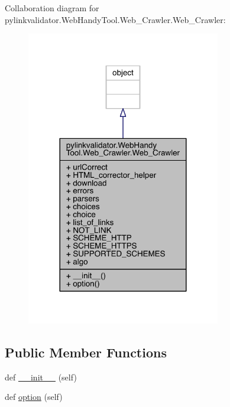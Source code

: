 Collaboration diagram for pylinkvalidator.\+Web\+Handy\+Tool.\+Web\+\_\+\+Crawler.\+Web\+\_\+\+Crawler\+:
\nopagebreak
\begin{figure}[H]
\begin{center}
\leavevmode
\includegraphics[width=240pt]{classpylinkvalidator_1_1_web_handy_tool_1_1_web___crawler_1_1_web___crawler__coll__graph}
\end{center}
\end{figure}
\subsection*{Public Member Functions}
\begin{DoxyCompactItemize}
\item 
def \hyperlink{classpylinkvalidator_1_1_web_handy_tool_1_1_web___crawler_1_1_web___crawler_a0c6acebeeeb1b339c5b04f2d74eabac0}{\+\_\+\+\_\+init\+\_\+\+\_\+} (self)
\item 
def \hyperlink{classpylinkvalidator_1_1_web_handy_tool_1_1_web___crawler_1_1_web___crawler_a1b3df36953ff7ba0450d1809e4d6defb}{option} (self)
\end{DoxyCompactItemize}
